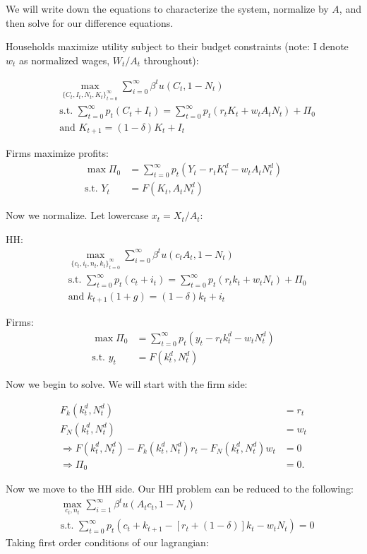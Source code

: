 \documentclass[11pt]{article} %
\begin{document}
We will write down the equations to characterize the system, normalize by $A$, and then solve for our difference equations. 

Households maximize utility subject to their budget constraints (note: I denote $w_t$ as normalized wages, $W_t/A_t$ throughout):

\begin{align*}
&\max_{\{C_t,I_t,N_t,K_t\}_{t=0}^{\infty}} \sum_{i=0}^{\infty}\beta^t u(C_t,1-N_t)\\
&\text{s.t. } \sum_{t=0}^{\infty} p_t (C_t + I_t) =  \sum_{t=0}^{\infty} p_t(r_tK_t + w_tA_tN_t) + \Pi_0\\
&\text{and } K_{t+1} = (1-\delta) K_t+ I_t
\end{align*}

Firms maximize profits:
\begin{align*}
\max \Pi_0 &=\sum_{t=0}^{\infty}p_t(Y_t -r_tK_t^d - w_t A_tN_t^d)\\
\text{s.t. } Y_t &= F(K_t,A_tN_t^d)
\end{align*}

Now we normalize. Let lowercase $x_t = X_t/A_t$:

HH:
\begin{align*}
&\max_{\{c_t,i_t,n_t,k_t\}_{t=0}^{\infty}} \sum_{i=0}^{\infty}\beta^t u(c_tA_t,1-N_t)\\
&\text{s.t. } \sum_{t=0}^{\infty} p_t (c_t + i_t) =  \sum_{t=0}^{\infty} p_t(r_tk_t + w_tN_t) + \Pi_0\\
&\text{and } k_{t+1}(1+g) = (1-\delta) k_t+ i_t
\end{align*}

Firms:
\begin{align*}
\max \Pi_0 &=\sum_{t=0}^{\infty}p_t(y_t -r_tk_t^d - w_t N_t^d)\\
\text{s.t. } y_t &= F(k_t^d,N_t^d)
\end{align*}

Now we begin to solve. We will start with the firm side:

\begin{align*}
F_k(k_t^d,N_t^d) &= r_t\\
F_N(k_t^d,N_t^d) &= w_t\\
\Rightarrow F(k_t^d,N_t^d) - F_k(k_t^d,N_t^d) r_t - F_N(k_t^d,N_t^d) w_t &= 0 \\\Rightarrow \Pi_0 &= 0.
\end{align*}

Now we move to the HH side. Our HH problem can be reduced to the following:
\begin{align*}
&\max_{c_t,n_t} \sum_{i=1}^{\infty}\beta^t u(A_tc_t,1-N_t)\\
&\text{s.t. } \sum_{t=0}^{\infty} p_t ( c_t + k_{t+1} - [r_t + (1-\delta)]k_t - w_tN_t ) = 0
\end{align*}
Taking first order conditions of our lagrangian:
\end{document}
